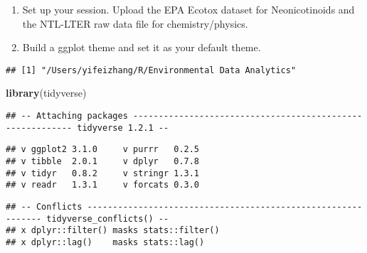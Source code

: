 \documentclass[]{article}
\newenvironment{Shaded}{\begin{snugshade}}{\end{snugshade}}
\newcommand{\KeywordTok}[1]{\textcolor[rgb]{0.13,0.29,0.53}{\textbf{#1}}}
\newcommand{\DataTypeTok}[1]{\textcolor[rgb]{0.13,0.29,0.53}{#1}}
\newcommand{\DecValTok}[1]{\textcolor[rgb]{0.00,0.00,0.81}{#1}}
\newcommand{\StringTok}[1]{\textcolor[rgb]{0.31,0.60,0.02}{#1}}
\newcommand{\CommentTok}[1]{\textcolor[rgb]{0.56,0.35,0.01}{\textit{#1}}}
\newcommand{\OperatorTok}[1]{\textcolor[rgb]{0.81,0.36,0.00}{\textbf{#1}}}
\newcommand{\NormalTok}[1]{#1}
\begin{document}
\begin{enumerate}
\def\labelenumi{\arabic{enumi}.}
\item
  Set up your session. Upload the EPA Ecotox dataset for Neonicotinoids
  and the NTL-LTER raw data file for chemistry/physics.
\item
  Build a ggplot theme and set it as your default theme.
\end{enumerate}

\begin{Shaded}
\end{Shaded}

\begin{verbatim}
## [1] "/Users/yifeizhang/R/Environmental Data Analytics"
\end{verbatim}

\begin{Shaded}
\begin{Highlighting}[]
\KeywordTok{library}\NormalTok{(tidyverse)}
\end{Highlighting}
\end{Shaded}

\begin{verbatim}
## -- Attaching packages ---------------------------------------------------------- tidyverse 1.2.1 --
\end{verbatim}

\begin{verbatim}
## v ggplot2 3.1.0     v purrr   0.2.5
## v tibble  2.0.1     v dplyr   0.7.8
## v tidyr   0.8.2     v stringr 1.3.1
## v readr   1.3.1     v forcats 0.3.0
\end{verbatim}

\begin{verbatim}
## -- Conflicts ------------------------------------------------------------- tidyverse_conflicts() --
## x dplyr::filter() masks stats::filter()
## x dplyr::lag()    masks stats::lag()
\end{verbatim}

\begin{Shaded}
\end{Shaded}
\end{document}
